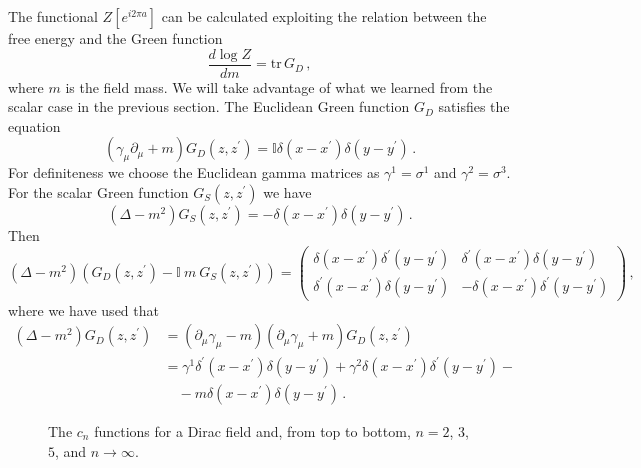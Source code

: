 \documentclass[11pt]{article}
\def\nn{\nonumber}
\begin{document}
The functional $Z[e^{i 2 \pi a}]$ can be calculated exploiting the relation between the free energy and the Green function  
\begin{equation}
\frac{d\log Z}{dm}=\textrm{tr} \, G_D\,,\label{pero}
\end{equation}
where $m$ is the field mass. 
 We will take advantage of what we learned from the scalar case in the previous section. The Euclidean Green function $G_D$ satisfies the equation
\begin{equation}
(\gamma_{\mu}\partial_{\mu}+m)G_D(z,z^{\prime})=\mathbb I \delta(x-x^{\prime})\delta(y-y^{\prime})\,. \label{deq}
\end{equation}
For definiteness we choose the Euclidean gamma matrices as $\gamma^1=\sigma^1$ and $\gamma^2=\sigma^3$.
For the scalar Green function $G_S(z,z^{\prime})$ we have
\begin{equation}
(\Delta-m^2)G_S(z,z^{\prime})=-\delta(x-x^{\prime})\delta(y-y^{\prime})\,.
\end{equation}
Then
\begin{equation}
(\Delta-m^2)(G_D(z,z^{\prime})-\mathbb I~m~G_S(z,z^{\prime}))=\begin{pmatrix}\delta(x-x^{\prime})\delta^{\prime}(y-y^{\prime})&\delta^{\prime}(x-x^{\prime})\delta(y-y^{\prime})\\\delta^{\prime}(x-x^{\prime})\delta(y-y^{\prime})&-\delta(x-x^{\prime})\delta^{\prime}(y-y^{\prime}) \end{pmatrix}\label{gsgd}\,,
\end{equation}
where we have used that
\begin{align}
(\Delta-m^2)G_D(z,z^{\prime})&=(\partial_{\mu}\gamma_{\mu}-m)(\partial_{\mu}\gamma_{\mu}+m)G_D(z,z^{\prime})\nonumber\\
&=\gamma^1 \delta^{\prime}(x-x^{\prime})\delta(y-y^{\prime})+\gamma^2 \delta(x-x^{\prime})\delta^{\prime}(y-y^{\prime})- \nn\\
& \quad - m\delta(x-x^{\prime})\delta(y-y^{\prime})\,.
\end{align}
 

\begin{figure} [tbp]
\centering
\leavevmode
\epsfxsize=8cm
\bigskip
{}
\caption{The $c_n$ functions for a Dirac field and, from top to bottom,  $n=2$, $3$, $5$, and $n\rightarrow \infty$.}
\label{fyfy}
\end{figure}
\end{document}
